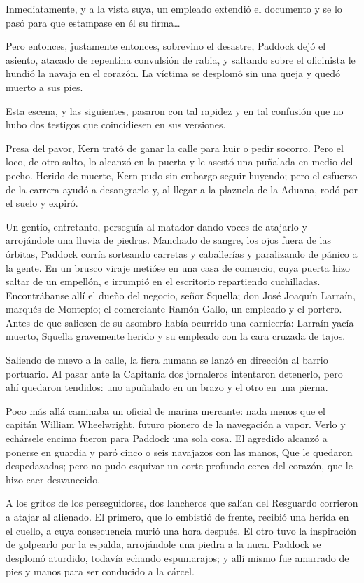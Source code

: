 \documentclass[10pt,twoside,openright]{memoir}
\begin{document}
Inmediatamente, y a la vista suya, un empleado extendió el documento y
se lo pasó para que estampase en él su firma\ldots

Pero entonces, justamente entonces, sobrevino el desastre, Paddock dejó
el asiento, atacado de repentina convulsión de rabia, y saltando sobre
el oficinista le hundió la navaja en el corazón. La víctima se desplomó
sin una queja y quedó muerto a sus pies.

Esta escena, y las siguientes, pasaron con tal rapidez y en tal
confusión que no hubo dos testigos que coincidiesen en sus versiones.

Presa del pavor, Kern trató de ganar
la calle para huir o pedir socorro. Pero el loco, de otro salto, lo
alcanzó en la puerta y le asestó una puñalada en medio del pecho. Herido
de muerte, Kern pudo sin embargo seguir huyendo; pero el esfuerzo de la
carrera ayudó a desangrarlo y, al llegar a la plazuela de la Aduana,
rodó por el suelo y expiró.

Un gentío, entretanto, perseguía al matador dando voces de atajarlo y
arrojándole una lluvia de piedras. Manchado de sangre, los ojos fuera de
las órbitas, Paddock corría
sorteando carretas y caballerías y paralizando de pánico a la gente. En
un brusco viraje metióse en una casa de comercio, cuya puerta hizo
saltar de un empellón, e irrumpió en el escritorio repartiendo
cuchilladas. Encontrábanse allí el dueño del negocio, señor Squella; don
José Joaquín Larraín, marqués de Montepío; el comerciante Ramón Gallo,
un empleado y el portero. Antes de que
saliesen de su asombro había
ocurrido una carnicería: Larraín yacía muerto, Squella gravemente herido
y su empleado con la cara cruzada de tajos.

Saliendo de nuevo a la calle, la fiera humana se lanzó en dirección al
barrio portuario. Al pasar ante la Capitanía dos jornaleros intentaron
detenerlo, pero ahí quedaron tendidos: uno apuñalado en un brazo y el
otro en una pierna.

Poco más allá caminaba un oficial de marina mercante: nada menos que el
capitán William Wheelwright, futuro pionero de la navegación a vapor.
Verlo y echársele encima fueron para Paddock una sola cosa. El agredido
alcanzó a ponerse en guardia y paró cinco o seis navajazos con las
manos, Que le quedaron despedazadas; pero no pudo esquivar un corte
profundo cerca del corazón, que le hizo caer desvanecido.

A los gritos de los perseguidores, dos lancheros
 que salían del Resguardo corrieron
a atajar al alienado. El primero, que lo embistió de frente, recibió una
herida en el cuello, a cuya consecuencia murió una hora después. El otro
tuvo la inspiración de golpearlo por la espalda, arrojándole una piedra
a la nuca. Paddock se desplomó aturdido, todavía echando espumarajos; y
allí mismo fue amarrado de pies y manos para ser conducido a la cárcel.
\end{document}
